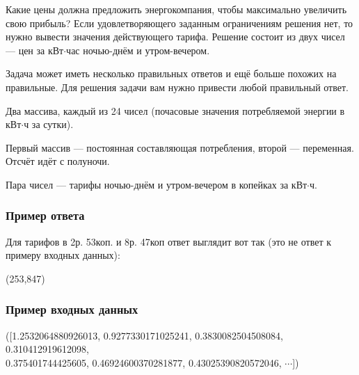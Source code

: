 Какие цены должна предложить энергокомпания, чтобы максимально увеличить свою прибыль? Если удовлетворяющего заданным ограничениям решения нет, то нужно вывести значения действующего тарифа. 
Решение состоит из двух чисел — цен за кВт$\cdot$час ночью-днём и утром-вечером.

Задача может иметь несколько правильных ответов и ещё больше похожих на правильные.
Для решения задачи вам нужно привести любой правильный ответ.


Два массива, каждый из 24 чисел (почасовые значения потребляемой энергии \linebreak в кВт$\cdot$ч за сутки). 

Первый массив — постоянная составляющая потребления, второй — переменная. Отсчёт идёт с полуночи.

\outputfmtSection

Пара чисел — тарифы ночью-днём и утром-вечером в копейках за кВт$\cdot$ч.

\subsubsection*{Пример ответа}

Для тарифов в 2р. 53коп. и 8р. 47коп ответ выглядит вот так (это не ответ к примеру входных данных):

(253,847)

\subsubsection*{Пример входных данных}
\noindent([1.2532064880926013, 0.9277330171025241, 0.3830082504508084, 0.310412919612098, \\
0.375401744425605, 0.46924600370281877, 0.43025390820572046, $\cdots$])


